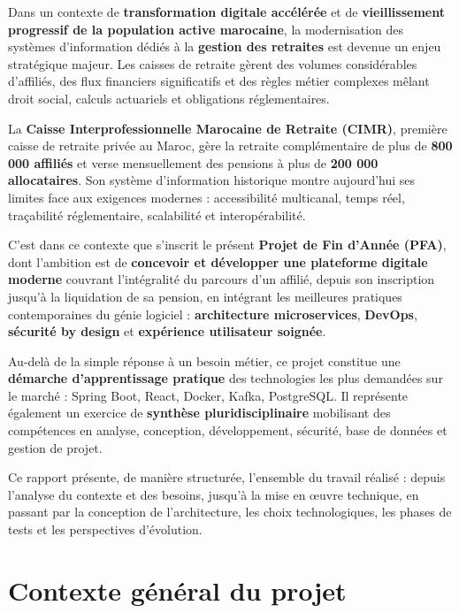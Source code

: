 \documentclass[12pt,a4paper,oneside]{report}
\begin{document}
Dans un contexte de \textbf{transformation digitale accélérée} et de \textbf{vieillissement progressif de la population active marocaine}, la modernisation des systèmes d'information dédiés à la \textbf{gestion des retraites} est devenue un enjeu stratégique majeur. Les caisses de retraite gèrent des volumes considérables d'affiliés, des flux financiers significatifs et des règles métier complexes mêlant droit social, calculs actuariels et obligations réglementaires.

La \textbf{Caisse Interprofessionnelle Marocaine de Retraite (CIMR)}, première caisse de retraite privée au Maroc, gère la retraite complémentaire de plus de \textbf{800 000 affiliés} et verse mensuellement des pensions à plus de \textbf{200 000 allocataires}. Son système d'information historique montre aujourd'hui ses limites face aux exigences modernes : accessibilité multicanal, temps réel, traçabilité réglementaire, scalabilité et interopérabilité.

C'est dans ce contexte que s'inscrit le présent \textbf{Projet de Fin d'Année (PFA)}, dont l'ambition est de \textbf{concevoir et développer une plateforme digitale moderne} couvrant l'intégralité du parcours d'un affilié, depuis son inscription jusqu'à la liquidation de sa pension, en intégrant les meilleures pratiques contemporaines du génie logiciel : \textbf{architecture microservices}, \textbf{DevOps}, \textbf{sécurité by design} et \textbf{expérience utilisateur soignée}.

Au-delà de la simple réponse à un besoin métier, ce projet constitue une \textbf{démarche d'apprentissage pratique} des technologies les plus demandées sur le marché : Spring Boot, React, Docker, Kafka, PostgreSQL. Il représente également un exercice de \textbf{synthèse pluridisciplinaire} mobilisant des compétences en analyse, conception, développement, sécurité, base de données et gestion de projet.

Ce rapport présente, de manière structurée, l'ensemble du travail réalisé : depuis l'analyse du contexte et des besoins, jusqu'à la mise en œuvre technique, en passant par la conception de l'architecture, les choix technologiques, les phases de tests et les perspectives d'évolution.

\chapter{Contexte général du projet}
\end{document}
